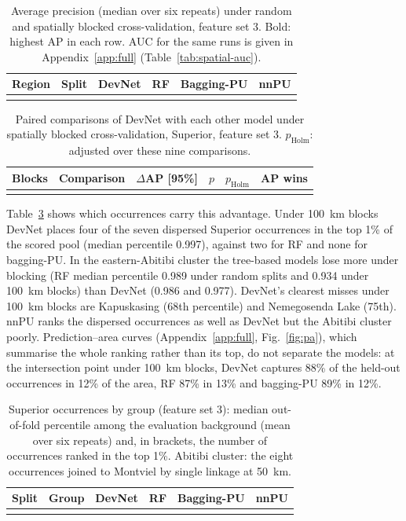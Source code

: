 \documentclass[pdflatex,sn-apa]{sn-jnl}
\begin{document}
\begin{table}[t]
\caption{Average precision (median over six repeats) under random and spatially blocked cross-validation, feature set 3. Bold: highest AP in each row. AUC for the same runs is given in Appendix~\ref{app:full} (Table~\ref{tab:spatial-auc}).}\label{tab:spatial}
\footnotesize
\setlength{\tabcolsep}{3pt}
\begin{tabular*}{\textwidth}{@{\extracolsep\fill}llcccc}
\toprule
Region & Split & DevNet & RF & Bagging-PU & nnPU \\
\midrule
\botrule
\end{tabular*}
\end{table}

\begin{table}[t]
\caption{Paired comparisons of DevNet with each other model under spatially blocked cross-validation, Superior, feature set 3. $p_{\mathrm{Holm}}$: adjusted over these nine comparisons.}\label{tab:spatial-boot}
\footnotesize
\begin{tabular*}{\textwidth}{@{\extracolsep\fill}llcccc}
\toprule
Blocks & Comparison & $\Delta$AP [95\%] & $p$ & $p_{\mathrm{Holm}}$ & AP wins \\
\midrule
\botrule
\end{tabular*}
\end{table}

Table~\ref{tab:occurrence} shows which occurrences carry this advantage. Under 100~km blocks DevNet places four of the seven dispersed Superior occurrences in the top 1\% of the scored pool (median percentile 0.997), against two for RF and none for bagging-PU. In the eastern-Abitibi cluster the tree-based models lose more under blocking (RF median percentile 0.989 under random splits and 0.934 under 100~km blocks) than DevNet (0.986 and 0.977). DevNet's clearest misses under 100~km blocks are Kapuskasing (68th percentile) and Nemegosenda Lake (75th). nnPU ranks the dispersed occurrences as well as DevNet but the Abitibi cluster poorly. Prediction--area curves (Appendix~\ref{app:full}, Fig.~\ref{fig:pa}), which summarise the whole ranking rather than its top, do not separate the models: at the intersection point under 100~km blocks, DevNet captures 88\% of the held-out occurrences in 12\% of the area, RF 87\% in 13\% and bagging-PU 89\% in 12\%.

\begin{table}[t]
\caption{Superior occurrences by group (feature set 3): median out-of-fold percentile among the evaluation background (mean over six repeats) and, in brackets, the number of occurrences ranked in the top 1\%. Abitibi cluster: the eight occurrences joined to Montviel by single linkage at 50~km.}\label{tab:occurrence}
\scriptsize
\setlength{\tabcolsep}{2.5pt}
\begin{tabular*}{\textwidth}{@{\extracolsep\fill}llcccc}
\toprule
Split & Group & DevNet & RF & Bagging-PU & nnPU \\
\midrule
\botrule
\end{tabular*}
\end{table}
\end{document}
